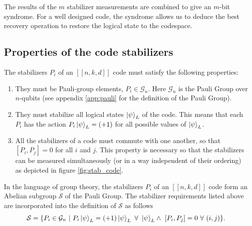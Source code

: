 \documentclass[]{arxiv}
\theoremstyle{plain}%
\theoremstyle{definition}
\theoremstyle{remark}
\begin{document}
The results of the $m$ stabilizer measurements are combined to give an $m$-bit syndrome. For a well designed code, the syndrome allows us to deduce the best recovery operation to restore the logical state to the codespace.

\subsection{Properties of the code stabilizers}



The stabilizers $P_i$ of an $[[n,k,d]]$ code must satisfy the following properties:
%
\begin{enumerate}
\item They must be Pauli-group elements, $P_i \in \mathcal{G}_n$. Here $\mathcal{G}_n$ is the Pauli Group over $n$-qubits (see appendix \ref{app:pauli} for the definition of the Pauli Group).

\item They must stabilize all logical states $\ket{\psi}_L$ of the code. This means that each $P_i$ has the action $P_i\ket{\psi}_L=(+1)$ for all possible values of $\ket{\psi}_L$.

\item All the stabilizers of a code must commute with one another, so that $[P_i,P_j]=0$ for all $i$ and $j$. This property is necessary so that the stabilizers can be measured simultaneously (or in a way independent of their ordering) as depicted in figure \ref{fig:stab_code}.
  
\end{enumerate}
%
In the language of group theory, the stabilizers $P_i$ of an $[[n,k,d]]$ code form an Abelian subgroup $\mathcal{S}$ of the Pauli Group. The stabilizer requirements listed above are incorporated into the definition of $\mathcal{S}$ as follows
%
\begin{equation}\label{eq:stab_defs}
\mathcal{S}=\{P_i \in \mathcal{G}_n \ | \ P_i \ket{\psi}_L = (+1)\ket{\psi}_L \ \forall \ \ket{\psi}_L \wedge \ [P_i,P_j]=0 \ \forall \ (i,j)  \}\rm .
\end{equation}
%
\end{document}
